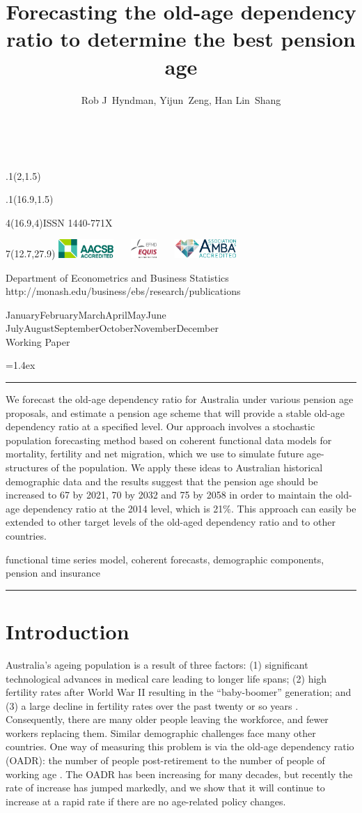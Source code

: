 \documentclass[11pt,a4paper,]{article}
\title{Forecasting the old-age dependency ratio to determine the best pension age}
\author{Rob J~Hyndman, Yijun~Zeng, Han Lin~Shang}
\date{\sf\Date~\Month~\Year}
\makeatletter
\def\Date{\number\day}
\def\Month{\ifcase\month\or
 January\or February\or March\or April\or May\or June\or
 July\or August\or September\or October\or November\or December\fi}
\def\Year{\number\year}
\def\showjel{{\large\textsf{\textbf{JEL classification:}}~\@jel}}
\def\cover{{\sffamily\setcounter{page}{0}
        \thispagestyle{empty}
        \placefig{2}{1.5}{width=5cm}{monash2}
        \placefig{16.9}{1.5}{width=2.1cm}{MBusSchool}
        \begin{textblock}{4}(16.9,4)ISSN 1440-771X\end{textblock}
        \begin{textblock}{7}(12.7,27.9)\hfill
        \includegraphics[height=0.7cm]{AACSB}~~~
        \includegraphics[height=0.7cm]{EQUIS}~~~
        \includegraphics[height=0.7cm]{AMBA}
        \end{textblock}
        \vspace*{2cm}
        \begin{center}\Large
        Department of Econometrics and Business Statistics\\[.5cm]
        \footnotesize http://monash.edu/business/ebs/research/publications
        \end{center}\vspace{2cm}
        \begin{center}
        \fbox{\parbox{14cm}{\begin{onehalfspace}\centering\Huge\vspace*{0.3cm}
                \textsf{\textbf{\expandafter{\@title}}}\vspace{1cm}\par
                \LARGE\@author\end{onehalfspace}
        }}
        \end{center}
        \vfill
                \begin{center}\Large
                \Month~\Year\\[1cm]
                Working Paper \@wp
        \end{center}\vspace*{2cm}}}
\def\pageone{{\sffamily\setstretch{1}%
        \thispagestyle{empty}%
        \vbox to \textheight{%
        \raggedright\baselineskip=1.2cm
     {\fontsize{24.88}{30}\sffamily\textbf{\expandafter{\@title}}}
        \vspace{2cm}\par
        \hspace{1cm}\parbox{14cm}{\sffamily\large\@addresses}\vspace{1cm}\vfill
        \hspace{1cm}{\large\Date~\Month~\Year}\\[1cm]
        \hspace{1cm}\showjel\vss}}}
\def\blindtitle{{\sffamily
     \thispagestyle{plain}\raggedright\baselineskip=1.2cm
     {\fontsize{24.88}{30}\sffamily\textbf{\expandafter{\@title}}}\vspace{1cm}\par
        }}
\def\titlepage{{\cover\newpage\pageone\newpage\blindtitle}}
\let\maketitle\titlepage
\newenvironment{keywords}{\par\vspace{0.5cm}\noindent{\sffamily\textbf{Keywords:}}}{\vspace{0.25cm}\par\hrule\vspace{0.5cm}\par}
\renewenvironment{abstract}{\begin{minipage}{\textwidth}\parskip=1.4ex\noindent
\hrule\vspace{0.1cm}\par{\sffamily\textbf{\abstractname}}\newline}
  {\end{minipage}}
\def\placefig#1#2#3#4{\begin{textblock}{.1}(#1,#2)\rlap{\texttt{[image: \#4]}}\end{textblock}}
\makeatother
\begin{document}
\maketitle
\begin{abstract}
We forecast the old-age dependency ratio for Australia under various pension age proposals, and estimate a pension age scheme that will provide a stable old-age dependency ratio at a specified level. Our approach involves a stochastic population forecasting method based on coherent functional data models for mortality, fertility and net migration, which we use to simulate future age-structures of the population. We apply these ideas to Australian historical demographic data and the results suggest that the pension age should be increased to 67 by 2021, 70 by 2032 and 75 by 2058 in order to maintain the old-age dependency ratio at the 2014 level, which is 21\%. This approach can easily be extended to other target levels of the old-aged dependency ratio and to other countries.
\end{abstract}
\begin{keywords}
functional time series model, coherent forecasts, demographic components, pension and insurance
\end{keywords}

\hypertarget{introduction}{%
\section{Introduction}\label{introduction}}

Australia's ageing population is a result of three factors: (1) significant technological advances in medical care leading to longer life spans; (2) high fertility rates after World War II resulting in the ``baby-boomer'' generation; and (3) a large decline in fertility rates over the past twenty or so years \autocite{Fehr2008}. Consequently, there are many older people leaving the workforce, and fewer workers replacing them. Similar demographic challenges face many other countries. One way of measuring this problem is via the old-age dependency ratio (OADR): the number of people post-retirement to the number of people of working age \autocite{Walker1982}. The OADR has been increasing for many decades, but recently the rate of increase has jumped markedly, and we show that it will continue to increase at a rapid rate if there are no age-related policy changes.
\end{document}
